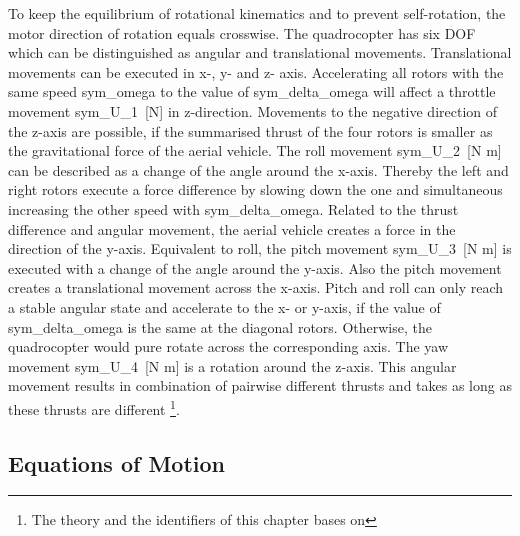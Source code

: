 To keep the equilibrium of rotational kinematics and to prevent self-rotation,
the motor direction of rotation equals crosswise. The quadrocopter has six \gls{DOF}
~ which can be distinguished as angular and translational movements.
Translational movements can be executed in x-, y- and z- axis.
 Accelerating all rotors with the same speed \gls{sym_omega} to the value
 of \gls{sym_delta_omega} will affect a throttle movement \gls{sym_U_1}~[N] in z-direction.
Movements to the negative direction of the z-axis are possible, if the summarised thrust of
the four rotors is smaller as the gravitational force of the aerial vehicle. The roll movement \gls{sym_U_2}~[N m]
 can be described as a change of the angle around the x-axis.
\newpage
Thereby the left and right rotors execute a force difference by slowing down
the one and simultaneous increasing the other speed with
\gls{sym_delta_omega}. 
Related to the thrust difference and angular
 movement, the aerial vehicle creates a force in the direction of the y-axis. Equivalent to roll,
 the pitch movement \gls{sym_U_3}~[N m] is executed with a change of the angle around the y-axis.
 Also the pitch movement creates a translational
movement across the x-axis. Pitch and roll can only reach a stable angular state
and accelerate to the x- or y-axis, if the value of
\gls{sym_delta_omega} 
is the same at the diagonal rotors. Otherwise, the quadrocopter would pure rotate
across the corresponding axis. The yaw movement \gls{sym_U_4}~[N m] is a rotation around the z-axis.
This angular movement results in combination of pairwise different thrusts and
takes as long as these thrusts are different \footnote{The theory and the identifiers of this chapter bases on }.


\subsection{Equations of Motion} %
\label{mt:c:literature:s:equations_of_motion}

